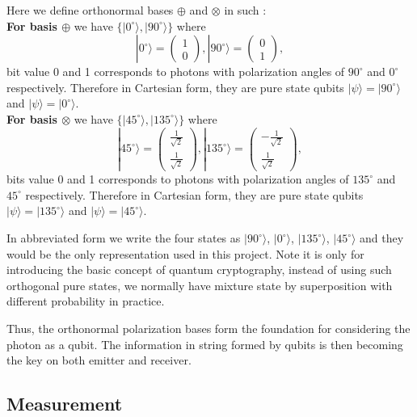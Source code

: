 \documentclass[12pt]{article}
\begin{document}
Here we define orthonormal bases $\oplus$ and $\otimes$ in such \cite[p.249]{fox2006quantum}:\\
\textbf{For basis $\oplus$} we have $\{|0^{\circ}\rangle,|90^{\circ}\rangle\}$ where 
\[
	|0^{\circ}\rangle =\begin{pmatrix}
1\\0
\end{pmatrix}, 
|90^{\circ}\rangle=\begin{pmatrix}
0\\1
\end{pmatrix},
\]
bit value 0 and 1 corresponds to photons with polarization angles of $90^{\circ}$ and $0^{\circ}$ respectively. Therefore in Cartesian form, they are pure state qubits $|\psi\rangle=|90^{\circ}\rangle$ and $|\psi\rangle=|0^{\circ}\rangle$. \\
\textbf{For basis $\otimes$} we have $\{|45^{\circ}\rangle,|135^{\circ}\rangle\}$ where 
\[
	|45^{\circ}\rangle =\begin{pmatrix}
\frac{1}{\sqrt{2}}\\ \frac{1}{\sqrt{2}}
\end{pmatrix}, 
|135^{\circ}\rangle=\begin{pmatrix}
-\frac{1}{\sqrt{2}}\\\frac{1}{\sqrt{2}}
\end{pmatrix},
\]
bits value 0 and 1 corresponds to photons with polarization angles of $135^{\circ}$ and $45^{\circ}$ respectively. Therefore in Cartesian form, they are pure state qubits $|\psi\rangle=|135^{\circ}\rangle$ and $|\psi\rangle=|45^{\circ}\rangle$.

In abbreviated form we write the four states as $|90^{\circ}\rangle$, $|0^{\circ}\rangle$, $|135^{\circ}\rangle$, $|45^{\circ}\rangle$ and they would be the only representation used in this project. Note it is only for introducing the basic concept of quantum cryptography, instead of using such orthogonal pure states, we normally have mixture state by superposition with different probability in practice.

Thus, the orthonormal polarization bases form the foundation for considering the photon as a qubit. The information in string formed by qubits is then becoming the key on both emitter and receiver.
\subsection{Measurement} \label{measure}
\end{document}
